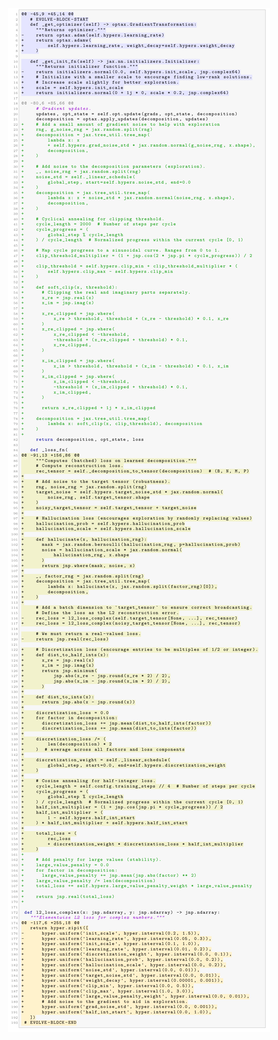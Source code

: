 \begin{figure}[p]
\vspace{-0.03\textwidth}
\hspace{-0.1\textwidth}
\begin{minipage}{0.32\textwidth}
%
\includegraphics[width=\linewidth]{code/diff_full.pdf}

\end{minipage}
\end{figure}

